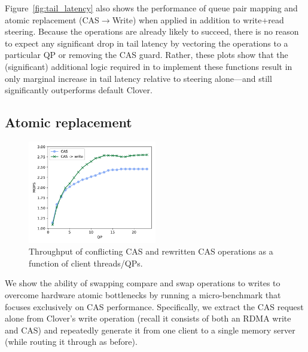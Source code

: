 Figure~\ref{fig:tail_latency} also shows the performance of queue pair
mapping and atomic replacement (CAS$\rightarrow$Write) when applied in addition
to write+read steering.  Because the operations are already likely to
succeed, there is no reason to expect any significant drop in tail
latency by vectoring the operations to a particular QP or removing the
CAS guard.  Rather, these plots show that the (significant) additional
logic required in {\sword} to implement these functions result in only
marginal increase in tail latency relative to steering alone---and still
significantly outperforms default Clover.



\subsection{Atomic replacement}

\begin{figure}
    \includegraphics[width=0.5\textwidth]{fig/cas_vs_swap.pdf}
    \caption{Throughput of conflicting CAS and rewritten CAS operations as a function of client threads/QPs.}
    \label{fig:cas_vs_swap}
\end{figure}

We show the ability of swapping compare and swap operations to writes
to overcome hardware atomic bottlenecks by running a micro-benchmark
that focuses exclusively on CAS performance.  Specifically, we extract
the CAS request alone from Clover's write operation (recall it
consists of both an RDMA write and CAS) and repeatedly generate it
from one client to a single memory server (while routing it through
{\sword} as before).


